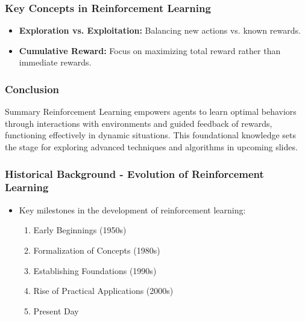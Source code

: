 \documentclass[aspectratio=169]{beamer}
\begin{document}
\begin{frame}[fragile]
    \frametitle{Key Concepts in Reinforcement Learning}
    \begin{itemize}
        \item \textbf{Exploration vs. Exploitation:} Balancing new actions vs. known rewards.
        \item \textbf{Cumulative Reward:} Focus on maximizing total reward rather than immediate rewards.
    \end{itemize}
\end{frame}

\begin{frame}[fragile]
    \frametitle{Conclusion}
    \begin{block}{Summary}
        Reinforcement Learning empowers agents to learn optimal behaviors through interactions with environments and guided feedback of rewards, functioning effectively in dynamic situations. This foundational knowledge sets the stage for exploring advanced techniques and algorithms in upcoming slides.
    \end{block}
\end{frame}

\begin{frame}[fragile]
    \frametitle{Historical Background - Evolution of Reinforcement Learning}
    \begin{itemize}
        \item Key milestones in the development of reinforcement learning:
        \begin{enumerate}
            \item Early Beginnings (1950s)
            \item Formalization of Concepts (1980s)
            \item Establishing Foundations (1990s)
            \item Rise of Practical Applications (2000s)
            \item Present Day
        \end{enumerate}
    \end{itemize}
\end{frame}
\end{document}
